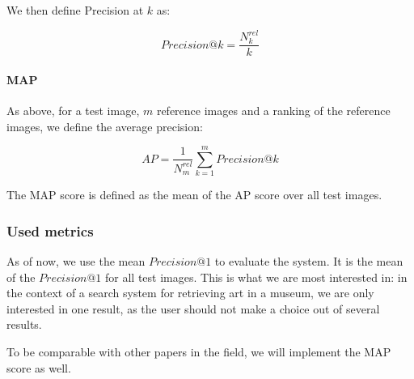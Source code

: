 \documentclass[fleqn]{article}
\begin{document}
We then define Precision at $k$ as:

\begin{equation}
Precision@k = \frac{N^{rel}_k}{k}
\end{equation}

\paragraph{MAP}
As above, for a test image, $m$ reference images and a ranking
of the reference images, we define the average precision:

\begin{equation}
AP = \frac{1}{N^{rel}_m} \sum_{k=1}^m Precision@k
\end{equation}

The MAP score is defined as the mean of the AP score over all test images.

\subsubsection{Used metrics}
As of now, we use the mean $Precision@1$ to evaluate the system.
It is the mean of the $Precision@1$ for all test images.
This is what we are most interested in: in the context of a
search system for retrieving art in a museum, we are only
interested in one result, as the user should not make a choice
out of several results.

To be comparable with other papers in the field, we will implement
the MAP score as well.




\end{document}
